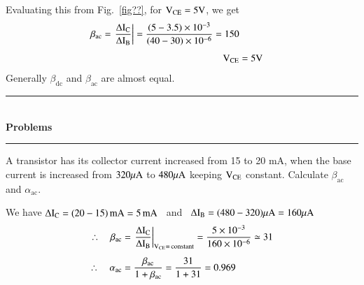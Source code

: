 Evaluating this from Fig.~\ref{fig??}, for $\textrm{V}_{\text{CE}}=5\textrm{V}$, we get
\begin{align*}
\beta_{\text{ac}}=\left.\dfrac{\Delta \textrm{I}_{\textrm{C}}}{\Delta \textrm{I}_{\textrm{B}}}\right|=\dfrac{(5-3.5)\times 10^{-3}}{(40-30)\times 10^{-6}}=150\\[4pt]
\textrm{V}_{\text{CE}} &= 5\textrm{V}
\end{align*}
Generally $\beta_{\text{dc}}$ and $\beta_{\text{ac}}$ are almost equal.

\medskip

\begin{center}
\rule{4cm}{1pt}\\
{\bf\Large Problems}\\[-3pt]
\rule{4cm}{1pt}
\end{center}

\begin{problem}\label{prob2.12}
A transistor has its collector current increased from 15 to 20 mA, when the base current is increased from $320\mu\textrm{A}$ to $480\mu\textrm{A}$ keeping $\textrm{V}_{\text{CE}}$ constant. Calculate $\beta_{\text{ac}}$ and $\alpha_{\text{ac}}$.
\end{problem}

\begin{solution}
We have $\Delta \textrm{I}_{\textrm{C}}=(20-15)\text{\,mA}=5\text{\,mA}$ \ and  \ $\Delta \textrm{I}_{\textrm{B}}=(480-320)\mu\textrm{A}=160\mu\textrm{A}$
\begin{align*}
\therefore\quad \beta_{\text{ac}} &= \left.\dfrac{\Delta \textrm{I}_{\textrm{C}}}{\Delta \textrm{I}_{\textrm{B}}}\right|_{\textrm{V}_{\text{CE}}=\text{\,constant}}=\dfrac{5\times 10^{-3}}{160\times 10^{-6}}\simeq 31\\[4pt]
\therefore\quad \alpha_{\text{ac}} &= \frac{\beta_{\text{ac}}}{1+\beta_{\text{ac}}}=\dfrac{31}{1+31}=0.969
\end{align*}
\end{solution}

\eject

